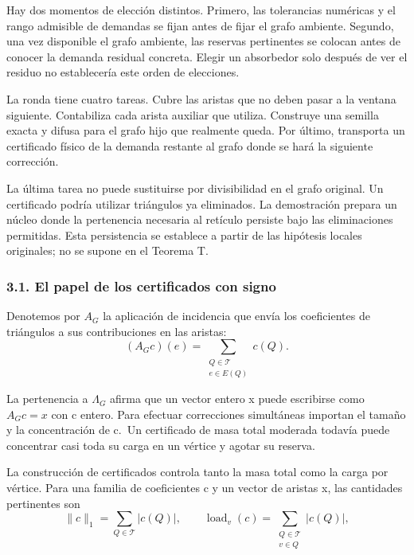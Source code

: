 \documentclass[spanish,11pt,a4paper]{article}
\begin{document}
Hay dos momentos de elección distintos. Primero, las tolerancias numéricas y el rango admisible de demandas se fijan antes de fijar el grafo ambiente. Segundo, una vez disponible el grafo ambiente, las reservas pertinentes se colocan antes de conocer la demanda residual concreta. Elegir un absorbedor solo después de ver el residuo no establecería este orden de elecciones.

La ronda tiene cuatro tareas. Cubre las aristas que no deben pasar a la ventana siguiente. Contabiliza cada arista auxiliar que utiliza. Construye una semilla exacta y difusa para el grafo hijo que realmente queda. Por último, transporta un certificado físico de la demanda restante al grafo donde se hará la siguiente corrección.

La última tarea no puede sustituirse por divisibilidad en el grafo original. Un certificado podría utilizar triángulos ya eliminados. La demostración prepara un núcleo donde la pertenencia necesaria al retículo persiste bajo las eliminaciones permitidas. Esta persistencia se establece a partir de las hipótesis locales originales; no se supone en el Teorema T.

\subsubsection{3.1. El papel de los certificados con signo}\label{el-papel-de-los-certificados-con-signo}

Denotemos por \(A_G\) la aplicación de incidencia que envía los coeficientes de triángulos a sus contribuciones en las aristas:
\[(A_Gc)(e)=\sum_{\substack{Q\in\mathcal T\\e\in E(Q)}}c(Q).
                                                                    \tag{3.1}\]

La pertenencia a \(\Lambda_G\) afirma que un vector entero x puede escribirse como \(A_Gc=x\) con c entero. Para efectuar correcciones simultáneas importan el tamaño y la concentración de c.~Un certificado de masa total moderada todavía puede concentrar casi toda su carga en un vértice y agotar su reserva.

La construcción de certificados controla tanto la masa total como la carga por vértice. Para una familia de coeficientes c y un vector de aristas x, las cantidades pertinentes son
\[\|c\|_1=\sum_{Q\in\mathcal T}|c(Q)|,
\qquad
\operatorname{load}_v(c)=\sum_{\substack{Q\in\mathcal T\\v\in Q}}|c(Q)|,
                                                                    \tag{3.2}\]
\end{document}
